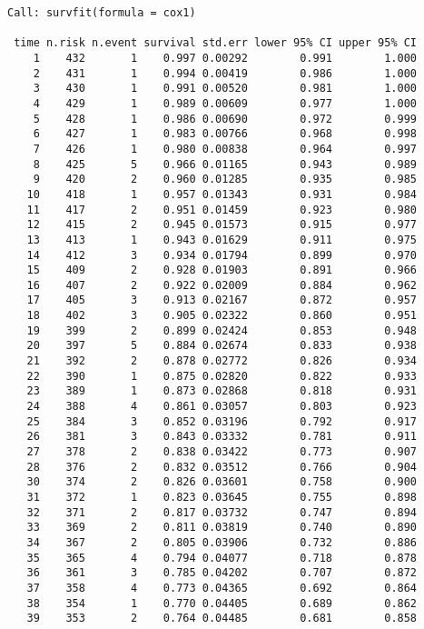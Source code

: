 \documentclass[
]{article}
\begin{document}
\begin{verbatim}
Call: survfit(formula = cox1)

 time n.risk n.event survival std.err lower 95% CI upper 95% CI
    1    432       1    0.997 0.00292        0.991        1.000
    2    431       1    0.994 0.00419        0.986        1.000
    3    430       1    0.991 0.00520        0.981        1.000
    4    429       1    0.989 0.00609        0.977        1.000
    5    428       1    0.986 0.00690        0.972        0.999
    6    427       1    0.983 0.00766        0.968        0.998
    7    426       1    0.980 0.00838        0.964        0.997
    8    425       5    0.966 0.01165        0.943        0.989
    9    420       2    0.960 0.01285        0.935        0.985
   10    418       1    0.957 0.01343        0.931        0.984
   11    417       2    0.951 0.01459        0.923        0.980
   12    415       2    0.945 0.01573        0.915        0.977
   13    413       1    0.943 0.01629        0.911        0.975
   14    412       3    0.934 0.01794        0.899        0.970
   15    409       2    0.928 0.01903        0.891        0.966
   16    407       2    0.922 0.02009        0.884        0.962
   17    405       3    0.913 0.02167        0.872        0.957
   18    402       3    0.905 0.02322        0.860        0.951
   19    399       2    0.899 0.02424        0.853        0.948
   20    397       5    0.884 0.02674        0.833        0.938
   21    392       2    0.878 0.02772        0.826        0.934
   22    390       1    0.875 0.02820        0.822        0.933
   23    389       1    0.873 0.02868        0.818        0.931
   24    388       4    0.861 0.03057        0.803        0.923
   25    384       3    0.852 0.03196        0.792        0.917
   26    381       3    0.843 0.03332        0.781        0.911
   27    378       2    0.838 0.03422        0.773        0.907
   28    376       2    0.832 0.03512        0.766        0.904
   30    374       2    0.826 0.03601        0.758        0.900
   31    372       1    0.823 0.03645        0.755        0.898
   32    371       2    0.817 0.03732        0.747        0.894
   33    369       2    0.811 0.03819        0.740        0.890
   34    367       2    0.805 0.03906        0.732        0.886
   35    365       4    0.794 0.04077        0.718        0.878
   36    361       3    0.785 0.04202        0.707        0.872
   37    358       4    0.773 0.04365        0.692        0.864
   38    354       1    0.770 0.04405        0.689        0.862
   39    353       2    0.764 0.04485        0.681        0.858

\end{verbatim}
\end{document}
